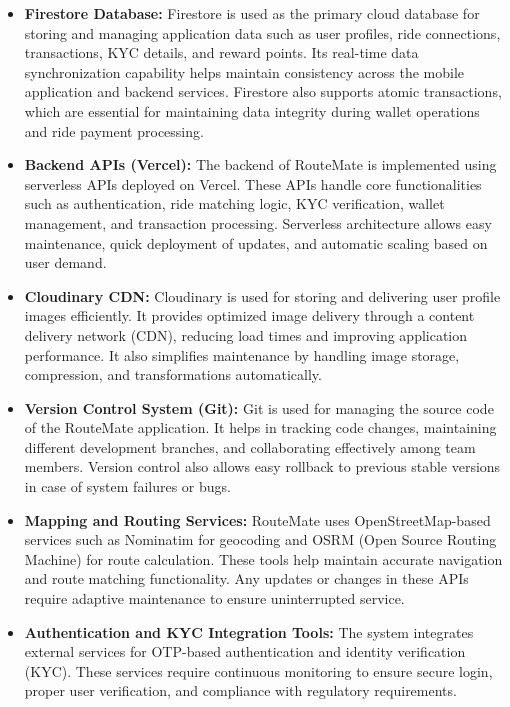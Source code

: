 \documentclass[10pt,a4paper]{report}
\begin{document}
\begin{itemize}

\item \textbf{Firestore Database:}
Firestore is used as the primary cloud database for storing and managing application data such as user profiles, ride connections, transactions, KYC details, and reward points. Its real-time data synchronization capability helps maintain consistency across the mobile application and backend services. Firestore also supports atomic transactions, which are essential for maintaining data integrity during wallet operations and ride payment processing.

\item \textbf{Backend APIs (Vercel):}
The backend of RouteMate is implemented using serverless APIs deployed on Vercel. These APIs handle core functionalities such as authentication, ride matching logic, KYC verification, wallet management, and transaction processing. Serverless architecture allows easy maintenance, quick deployment of updates, and automatic scaling based on user demand.

\item \textbf{Cloudinary CDN:}
Cloudinary is used for storing and delivering user profile images efficiently. It provides optimized image delivery through a content delivery network (CDN), reducing load times and improving application performance. It also simplifies maintenance by handling image storage, compression, and transformations automatically.

\item \textbf{Version Control System (Git):}
Git is used for managing the source code of the RouteMate application. It helps in tracking code changes, maintaining different development branches, and collaborating effectively among team members. Version control also allows easy rollback to previous stable versions in case of system failures or bugs.

\item \textbf{Mapping and Routing Services:}
RouteMate uses OpenStreetMap-based services such as Nominatim for geocoding and OSRM (Open Source Routing Machine) for route calculation. These tools help maintain accurate navigation and route matching functionality. Any updates or changes in these APIs require adaptive maintenance to ensure uninterrupted service.

\item \textbf{Authentication and KYC Integration Tools:}
The system integrates external services for OTP-based authentication and identity verification (KYC). These services require continuous monitoring to ensure secure login, proper user verification, and compliance with regulatory requirements.


\end{itemize}
\end{document}
